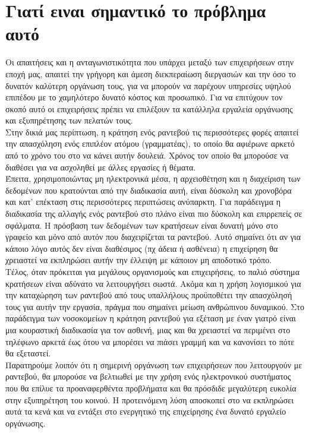 \documentclass[12pt]{article}
\begin{document}
\section {Γιατί ειναι σημαντικό το πρόβλημα αυτό}
Οι απαιτήσεις και η ανταγωνιστικότητα που υπάρχει μεταξύ των επιχειρήσεων στην εποχή μας, απαιτεί την γρήγορη και άμεση διεκπεραίωση διεργασιών και την όσο το δυνατόν καλύτερη οργάνωση τους, για να μπορούν να παρέχουν υπηρεσίες υψηλού επιπέδου με το χαμηλότερο δυνατό κόστος και προσωπικό. Για να επιτύχουν τον σκοπό αυτό οι επιχειρήσεις πρέπει να επιλέξουν τα κατάλληλα εργαλεία οργάνωσης και εξυπηρέτησης των πελατών τους.
\\[0.3cm]
Στην δικιά μας περίπτωση, η κράτηση ενός ραντεβού τις περισσότερες φορές απαιτεί την απασχόληση ενός επιπλέον ατόμου (γραμματέας), το οποίο θα αφιέρωνε αρκετό από το χρόνο του στο να κάνει αυτήν δουλειά. Χρόνος τον οποίο θα μπορούσε να διαθέσει για να ασχοληθεί με άλλες εργασίες ή θέματα. 
\\[0.3cm]
Έπειτα, χρησιμοποιώντας μη ηλεκτρονικά μέσα, η αρχειοθέτηση και η διαχείριση των δεδομένων που κρατούνται από την διαδικασία αυτή, είναι δύσκολη και χρονοβόρα και κατ' επέκταση στις περισσότερες περιπτώσεις ανύπαρκτη. Για παράδειγμα η διαδικασία της αλλαγής ενός ραντεβού στο πλάνο είναι πιο δύσκολη και επιρρεπείς σε σφάλματα. Η πρόσβαση των δεδομένων των κρατήσεων είναι δυνατή μόνο στο γραφείο και μόνο από αυτόν που διαχειρίζεται τα ραντεβού. Αυτό σημαίνει ότι αν για κάποιο λόγο αυτός δεν είναι διαθέσιμος (πχ άδεια ή ασθένεια) η επιχείρηση θα χρειαστεί να εκπληρώσει αυτήν την έλλειψη με κάποιον μη αποδοτικό τρόπο. 
\\[0.3cm]
Τέλος, όταν πρόκειται για μεγάλους οργανισμούς και επιχειρήσεις, το παλιό σύστημα κρατήσεων είναι αδύνατο να λειτουργήσει σωστά. Ακόμα και η χρήση λογισμικού για την καταχώρηση των ραντεβού από τους υπαλλήλους προϋποθέτει την απασχόλησή τους για αυτήν την εργασία, πράγμα που σημαίνει μείωση ανθρώπινου δυναμικού. Στο παράδειγμα των νοσοκομείων η κράτηση ραντεβού για εξέταση με έναν γιατρό είναι μια κουραστική διαδικασία για τον ασθενή, μιας και θα χρειαστεί να περιμένει στο τηλέφωνο αρκετά έως ότου να μπορέσει να πιάσει γραμμή και να κανονίσει το πότε θα εξεταστεί.
\\[0.3cm]
Παρατηρούμε λοιπόν ότι η σημερινή οργάνωση των επιχειρήσεων που λειτουργούν με ραντεβού, θα μπορούσε να βελτιωθεί με την χρήση ενός ηλεκτρονικού συστήματος που θα επίλυε τα προαναφερθέντα προβλήματα και θα πρόσδιδε μεγαλύτερη ευκολία στην εξυπηρέτηση του κοινού. Η προτεινόμενη λύση αποσκοπεί στο να εκπληρώσει αυτά τα κενά και να εντάξει στο ενεργητικό της επιχείρησης ένα δυνατό εργαλείο οργάνωσης.
\end{document}
